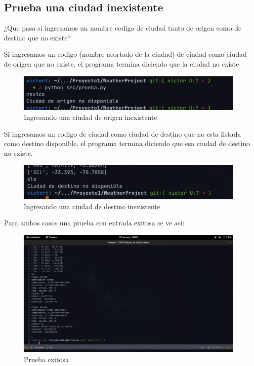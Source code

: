 \documentclass[12pt]{article}
\begin{document}
\subsection{Prueba una ciudad inexistente}
¿Que pasa si ingresamos un nombre codigo de ciudad tanto de origen como de destino que no existe?

Si ingresamos un codigo (nombre acortado de la ciudad) de ciudad como ciudad de origen que no existe, el programa termina diciendo que la ciudad no existe
\begin{figure}[h!]
  \centering
  \includegraphics[scale=0.5]{figures/ciudadOmal}
  \caption{Ingresando una ciudad de origen inexistente}
\end{figure}

Si ingresamos un codigo de ciudad como ciudad de destino que no esta listada como destino disponible, el programa termina diciendo que esa ciudad de destino no existe.
\begin{figure}[ht]
  \centering
  \includegraphics[scale=0.5]{figures/ciudadDmal}
  \caption{Ingresando una ciudad de destino inexistente}
\end{figure}
\newpage
Para ambos casos una prueba con entrada exitosa se ve asi:
\begin{figure}[ht]
  \centering
  \includegraphics[scale=0.3]{figures/pruebaBuena}
  \caption{Prueba exitosa}
\end{figure}
\end{document}
